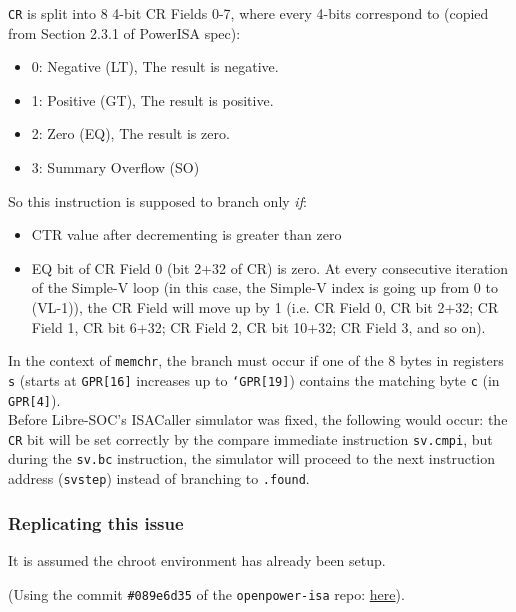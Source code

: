\texttt{CR} is split into 8 4-bit CR Fields 0-7, where every 4-bits correspond
to (copied from Section 2.3.1 of PowerISA spec):

\begin{itemize}
  \item 0: Negative (LT), The result is negative.
  \item 1: Positive (GT), The result is positive.
  \item 2: Zero (EQ), The result is zero.
  \item 3: Summary Overflow (SO)
\end{itemize}

So this instruction is supposed to branch only \textit{if}:

\begin{itemize}
  \item CTR value after decrementing is greater than zero
  \item EQ bit of CR Field 0 (bit 2+32 of CR) is zero.
At every consecutive iteration of the Simple-V loop (in this case,
the Simple-V index is going up from 0 to (VL-1)), the CR Field will move up
by 1 (i.e. CR Field 0, CR bit 2+32; CR Field 1, CR bit 6+32;
CR Field 2, CR bit 10+32; CR Field 3, and so on).
\end{itemize}

In the context of \texttt{memchr}, the branch must occur if one of the 8 bytes
in registers \texttt{s} (starts at \texttt{GPR[16]} increases up to
\texttt{`GPR[19]}) contains the matching byte \texttt{c}
(in \texttt{GPR[4]}).\\

Before Libre-SOC's ISACaller simulator was fixed, the following would occur:
the \texttt{CR} bit will be set correctly by the compare immediate instruction
\texttt{sv.cmpi}, but during the \texttt{sv.bc} instruction, the simulator
will proceed to the next instruction address (\texttt{svstep})
instead of branching to \texttt{.found}.

\subsubsection{Replicating this issue}

It is assumed the chroot environment has already been setup.

(Using the commit \texttt{\#089e6d35} of the \texttt{openpower-isa} repo:
\href{https://git.libre-soc.org/?p=openpower-isa.git;a=commitdiff;h=089e6d352ec57be4ab645d18ad9e95df3af0d365}{here}).

